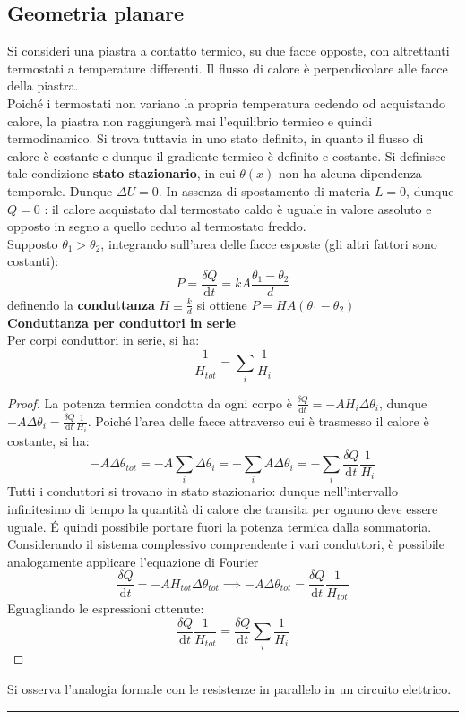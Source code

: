 \documentclass[10pt, oneside]{book}
\newcommand{\infobox}[2]{\vspace{0.5cm}~\\ \textbf{#1} \hrulefill \vspace{0.2cm}\\#2 {}\,\\\hrule \vspace{0.5cm}}
\newcommand{\ds}{\displaystyle}
\begin{document}
\subsection{Geometria planare}
Si consideri una piastra a contatto termico, su due facce opposte, con altrettanti termostati a temperature differenti. Il flusso di calore è perpendicolare alle facce della piastra.\\
Poiché i termostati non variano la propria temperatura cedendo od acquistando calore, la piastra non raggiungerà mai l'equilibrio termico e quindi termodinamico. Si trova tuttavia in uno stato definito, in quanto il flusso di calore è costante e dunque il gradiente termico è definito e costante. Si definisce tale condizione \textbf{stato stazionario}, in cui $\theta(x)$ non ha alcuna dipendenza temporale. Dunque $\Delta U = 0$. In assenza di spostamento di materia $L = 0$, dunque $Q = 0$ : il calore acquistato dal termostato caldo è uguale in valore assoluto e opposto in segno a quello ceduto al termostato freddo. \\
Supposto $\theta_1 > \theta_2$, integrando sull'area delle facce esposte (gli altri fattori sono costanti):
\[P = \frac{\delta Q}{\mathrm{d} t} = k A \frac{\theta_1 - \theta_2}{d}\]
definendo la \textbf{conduttanza} $\ds H \equiv \frac{k}{d}$ si ottiene $\ds P = HA (\theta_1 - \theta_2)$
\infobox{Conduttanza per conduttori in serie}{Per corpi conduttori in serie, si ha:
\[\frac{1}{H_{tot}} = \sum_i \frac{1}{H_i}\]
\begin{proof}
La potenza termica condotta da ogni corpo è $\ds \frac{\delta Q}{\mathrm{d} t} = - AH_i \Delta \theta_i$, dunque $-A \Delta \theta_i = \frac{\delta Q}{\mathrm{d} t} \frac{1}{H_i}$. Poiché l'area delle facce attraverso cui è trasmesso il calore è costante, si ha:
\[- A \Delta \theta_{tot} = - A \sum_i \Delta \theta_i = - \sum_i A \Delta \theta_i = - \sum_i \frac{\delta Q}{\mathrm{d} t} \frac{1}{H_i}\]
Tutti i conduttori si trovano in stato stazionario: dunque nell'intervallo infinitesimo di tempo la quantità di calore che transita per ognuno deve essere uguale. \'E quindi possibile portare fuori la potenza termica dalla sommatoria. Considerando il sistema complessivo comprendente i vari conduttori, è possibile analogamente applicare l'equazione di Fourier
\[\frac{\delta Q}{\mathrm{d} t} = -AH_{tot} \Delta \theta_{tot} \implies -A \Delta \theta_{tot} = \frac{\delta Q}{\mathrm{d} t} \frac{1}{H_{tot}}\]
Eguagliando le espressioni ottenute:
\[\frac{\delta Q}{\mathrm{d} t} \frac{1}{H_{tot}}= \frac{\delta Q}{\mathrm{d} t}\sum_i \frac{1}{H_i}\]
\end{proof}
Si osserva l'analogia formale con le resistenze in parallelo in un circuito elettrico.
}
\end{document}
